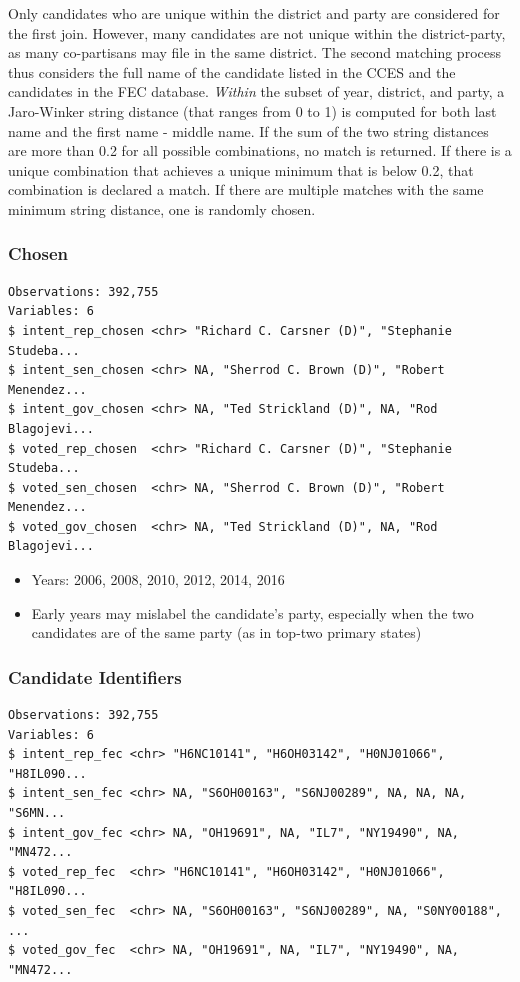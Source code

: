 \documentclass[10pt,article,oneside]{memoir}
\theoremstyle{definition}
\begin{document}
Only candidates who are unique within the district and party are
considered for the first join. However, many candidates are not unique
within the district-party, as many co-partisans may file in the same
district. The second matching process thus considers the full name of
the candidate listed in the CCES and the candidates in the FEC database.
\emph{Within} the subset of year, district, and party, a Jaro-Winker
string distance (that ranges from 0 to 1) is computed for both last name
and the first name - middle name. If the sum of the two string distances
are more than 0.2 for all possible combinations, no match is returned.
If there is a unique combination that achieves a unique minimum that is
below 0.2, that combination is declared a match. If there are multiple
matches with the same minimum string distance, one is randomly chosen.

\hypertarget{chosen}{%
\subsubsection{Chosen}\label{chosen}}

\begin{verbatim}
Observations: 392,755
Variables: 6
$ intent_rep_chosen <chr> "Richard C. Carsner (D)", "Stephanie Studeba...
$ intent_sen_chosen <chr> NA, "Sherrod C. Brown (D)", "Robert Menendez...
$ intent_gov_chosen <chr> NA, "Ted Strickland (D)", NA, "Rod Blagojevi...
$ voted_rep_chosen  <chr> "Richard C. Carsner (D)", "Stephanie Studeba...
$ voted_sen_chosen  <chr> NA, "Sherrod C. Brown (D)", "Robert Menendez...
$ voted_gov_chosen  <chr> NA, "Ted Strickland (D)", NA, "Rod Blagojevi...
\end{verbatim}

\begin{itemize}
\tightlist
\item
  Years: 2006, 2008, 2010, 2012, 2014, 2016
\item
  Early years may mislabel the candidate's party, especially when the
  two candidates are of the same party (as in top-two primary states)
\end{itemize}

\hypertarget{candidate-identifiers}{%
\subsubsection{Candidate Identifiers}\label{candidate-identifiers}}

\begin{verbatim}
Observations: 392,755
Variables: 6
$ intent_rep_fec <chr> "H6NC10141", "H6OH03142", "H0NJ01066", "H8IL090...
$ intent_sen_fec <chr> NA, "S6OH00163", "S6NJ00289", NA, NA, NA, "S6MN...
$ intent_gov_fec <chr> NA, "OH19691", NA, "IL7", "NY19490", NA, "MN472...
$ voted_rep_fec  <chr> "H6NC10141", "H6OH03142", "H0NJ01066", "H8IL090...
$ voted_sen_fec  <chr> NA, "S6OH00163", "S6NJ00289", NA, "S0NY00188", ...
$ voted_gov_fec  <chr> NA, "OH19691", NA, "IL7", "NY19490", NA, "MN472...
\end{verbatim}
\end{document}
